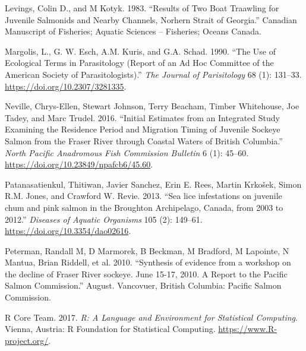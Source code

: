 \documentclass[fleqn,10pt]{wlpeerj} %
\begin{document}
\leavevmode\hypertarget{ref-Levings1983}{}%
Levings, Colin D., and M Kotyk. 1983. ``Results of Two Boat Traawling for Juvenile Salmonids and Nearby Channels, Norhern Strait of Georgia.'' Canadian Manuscript of Fisheries; Aquatic Sciences -- Fisheries; Oceans Canada.

\leavevmode\hypertarget{ref-Margolis1990}{}%
Margolis, L., G. W. Esch, A.M. Kuris, and G.A. Schad. 1990. ``The Use of Ecological Terms in Parasitology (Report of an Ad Hoc Committee of the American Society of Parasitologists).'' \emph{The Journal of Parisitology} 68 (1): 131--33. \url{https://doi.org/10.2307/3281335}.

\leavevmode\hypertarget{ref-Neville2016}{}%
Neville, Chrys-Ellen, Stewart Johnson, Terry Beacham, Timber Whitehouse, Joe Tadey, and Marc Trudel. 2016. ``Initial Estimates from an Integrated Study Examining the Residence Period and Migration Timing of Juvenile Sockeye Salmon from the Fraser River through Coastal Waters of British Columbia.'' \emph{North Pacific Anadromous Fish Commission Bulletin} 6 (1): 45--60. \url{https://doi.org/10.23849/npafcb6/45.60}.

\leavevmode\hypertarget{ref-Patanasatienkul2013}{}%
Patanasatienkul, Thitiwan, Javier Sanchez, Erin E. Rees, Martin Krkošek, Simon R.M. Jones, and Crawford W. Revie. 2013. ``Sea lice infestations on juvenile chum and pink salmon in the Broughton Archipelago, Canada, from 2003 to 2012.'' \emph{Diseases of Aquatic Organisms} 105 (2): 149--61. \url{https://doi.org/10.3354/dao02616}.

\leavevmode\hypertarget{ref-Peterman2010}{}%
Peterman, Randall M, D Marmorek, B Beckman, M Bradford, M Lapointe, N Mantua, Brian Riddell, et al. 2010. ``Synthesis of evidence from a workshop on the decline of Fraser River sockeye. June 15-17, 2010. A Report to the Pacific Salmon Commission.'' August. Vancovuer, British Columbia: Pacific Salmon Commission.

\leavevmode\hypertarget{ref-R}{}%
R Core Team. 2017. \emph{R: A Language and Environment for Statistical Computing}. Vienna, Austria: R Foundation for Statistical Computing. \url{https://www.R-project.org/}.
\end{document}
